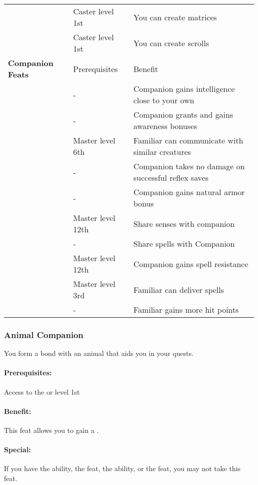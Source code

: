 \begin{table*}
{{\begin{tabular}{p{}p{}p{}}
\nameref{Feat:ImbueMatrix}&Caster level 1st&You can create matrices\\
\nameref{Feat:ScribeScroll}&Caster level 1st&You can create scrolls\\
\midrule
\textbf{Companion Feats}&Prerequisites&Benefit\\
\midrule
\nameref{Feat:CerebralCompanion}&-&Companion gains intelligence close to your own\\
\nameref{Feat:CompanionAlertness}&-&Companion grants and gains awareness bonuses\\
\nameref{Feat:CompanionCommunication}&Master level 6th&Familiar can communicate with similar creatures\\
\nameref{Feat:CompanionEvasion}&-&Companion takes no damage on successful reflex saves\\
\nameref{Feat:CompanionHardiness}&-&Companion gains natural armor bonus\\
\nameref{Feat:CompanionSightLink}&Master level 12th&Share senses with companion\\
\nameref{Feat:CompanionSpellLink}&-&Share spells with Companion\\
\nameref{Feat:CompanionSpellResistance}&Master level 12th&Companion gains spell resistance\\
\nameref{Feat:FamiliarSpellDelivery}&Master level 3rd&Familiar can deliver spells\\
\nameref{Feat:FamiliarToughness}&-&Familiar gains more hit points\\
\bottomrule
\end{tabular}}}
\end{table*}
\subsubsection{Animal Companion}
\label{Feat:AnimalCompanion}
You form a bond with an animal that aids you in your quests.

\paragraph{Prerequisites:} Access to the  or  level 1st

\paragraph{Benefit:} This feat allows you to gain a .

\paragraph{Special:} If you have the  ability, the  feat, the  ability, or the  feat, you may not take this feat.

